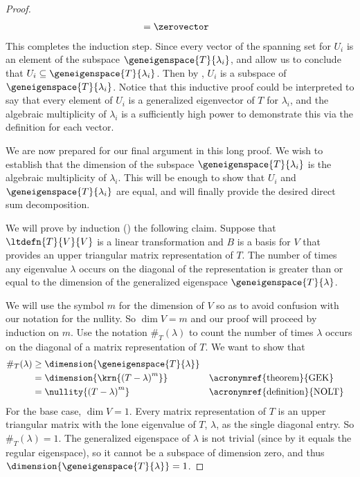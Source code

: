 \begin{proof}
\begin{align*}
%
&=\zerovector
%
\end{align*}
%
This completes the induction step.  Since every vector of the spanning set for $U_i$ is an element of the subspace $\geneigenspace{T}{\lambda_i}$,  and  allow us to conclude that $U_i\subseteq\geneigenspace{T}{\lambda_i}$.  Then by , $U_i$ is a subspace of $\geneigenspace{T}{\lambda_i}$.  Notice that this inductive proof could be interpreted to say that every element of $U_i$ is a generalized eigenvector of $T$ for $\lambda_i$, and the algebraic multiplicity of $\lambda_i$ is a sufficiently high power to demonstrate this via the definition for each vector.\par
%
We are now prepared for our final argument in this long proof.  We wish to establish that the dimension of the subspace $\geneigenspace{T}{\lambda_i}$ is the algebraic multiplicity of $\lambda_i$.  This will be enough to show that $U_i$ and $\geneigenspace{T}{\lambda_i}$ are equal, and will finally provide the desired direct sum decomposition.\par
%
We will prove by induction () the following claim.  Suppose that $\ltdefn{T}{V}{V}$ is a linear transformation and $B$ is a basis for $V$ that provides an upper triangular matrix representation of $T$.  The number of times any eigenvalue $\lambda$ occurs on the diagonal of the representation is greater than or equal to the dimension of the generalized eigenspace  $\geneigenspace{T}{\lambda}$.\par
%
We will use the symbol $m$ for the dimension of $V$ so as to avoid confusion with our notation for the nullity.  So $\dim{V}=m$ and our proof will proceed by induction on $m$.  Use the notation $\#_T(\lambda)$ to count the number of times $\lambda$ occurs on the diagonal of a matrix representation of $T$.  We want to show that 
%
\begin{align*}
\#_T(\lambda)&\geq\dimension{\geneigenspace{T}{\lambda}}\\
&=\dimension{\krn{\left(T-\lambda\right)^m}}&&\text{\acronymref{theorem}{GEK}}\\
&=\nullity{\left(T-\lambda\right)^m}&&\text{\acronymref{definition}{NOLT}}\\
\end{align*}
%
For the base case, $\dim{V}=1$.  Every matrix representation of $T$ is an upper triangular matrix with the lone eigenvalue of $T$, $\lambda$, as the single diagonal entry.  So $\#_T(\lambda)=1$.  The generalized eigenspace of $\lambda$ is not trivial (since by  it equals the regular eigenspace), so it cannot be a subspace of dimension zero, and thus $\dimension{\geneigenspace{T}{\lambda}}=1$.\par

\end{proof}
